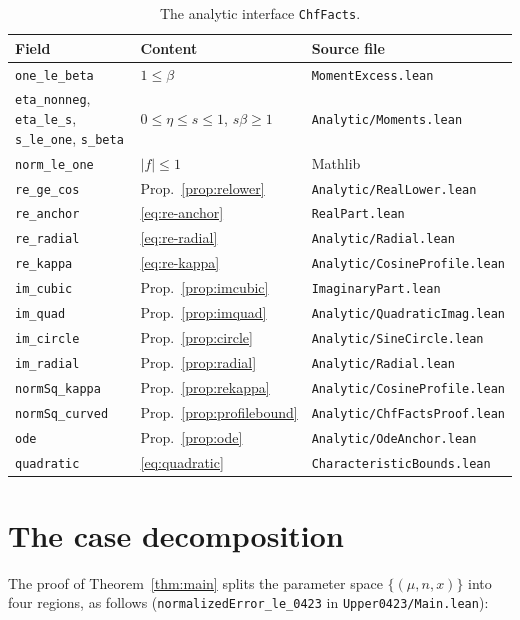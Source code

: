 \documentclass[11pt,a4paper]{article}
\theoremstyle{definition}
\newcommand{\Lean}[1]{\texttt{#1}}
\newcommand{\file}[1]{\texttt{#1}}
\begin{document}
\begin{table}[htbp]
  \centering\footnotesize
  \begin{tabular}{llp{5.2cm}}
    \toprule
    Field & Content & Source file\\
    \midrule
    \Lean{one\_le\_beta} & $1\le\beta$ & \file{MomentExcess.lean}\\
    \Lean{eta\_nonneg}, \Lean{eta\_le\_s}, \Lean{s\_le\_one}, \Lean{s\_beta}
      & $0\le\eta\le s\le1$, $s\beta\ge1$ & \file{Analytic/Moments.lean}\\
    \Lean{norm\_le\_one} & $|f|\le1$ & Mathlib\\
    \Lean{re\_ge\_cos} & Prop.~\ref{prop:relower} & \file{Analytic/RealLower.lean}\\
    \Lean{re\_anchor} & \eqref{eq:re-anchor} & \file{RealPart.lean}\\
    \Lean{re\_radial} & \eqref{eq:re-radial} & \file{Analytic/Radial.lean}\\
    \Lean{re\_kappa} & \eqref{eq:re-kappa} & \file{Analytic/CosineProfile.lean}\\
    \Lean{im\_cubic} & Prop.~\ref{prop:imcubic} & \file{ImaginaryPart.lean}\\
    \Lean{im\_quad} & Prop.~\ref{prop:imquad} & \file{Analytic/QuadraticImag.lean}\\
    \Lean{im\_circle} & Prop.~\ref{prop:circle} & \file{Analytic/SineCircle.lean}\\
    \Lean{im\_radial} & Prop.~\ref{prop:radial} & \file{Analytic/Radial.lean}\\
    \Lean{normSq\_kappa} & Prop.~\ref{prop:rekappa} & \file{Analytic/CosineProfile.lean}\\
    \Lean{normSq\_curved} & Prop.~\ref{prop:profilebound} & \file{Analytic/ChfFactsProof.lean}\\
    \Lean{ode} & Prop.~\ref{prop:ode} & \file{Analytic/OdeAnchor.lean}\\
    \Lean{quadratic} & \eqref{eq:quadratic} & \file{CharacteristicBounds.lean}\\
    \bottomrule
  \end{tabular}
  \caption{The analytic interface \Lean{ChfFacts}.}
  \label{tab:chf}
\end{table}

\section{The case decomposition}
\label{sec:split}

The proof of Theorem~\ref{thm:main} splits the parameter space
$\{(\mu,n,x)\}$ into four regions, as follows
(\Lean{normalizedError\_le\_0423} in \file{Upper0423/Main.lean}):
\end{document}
